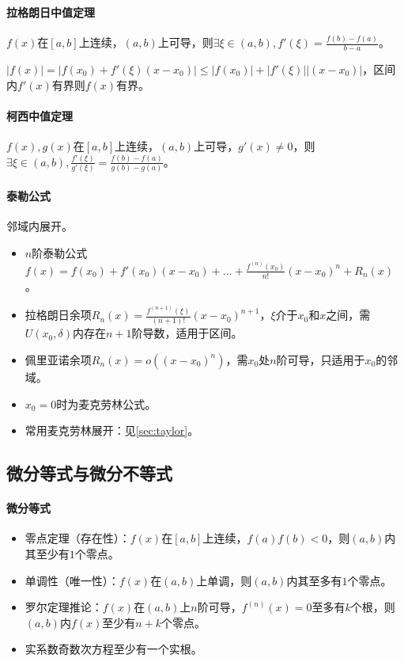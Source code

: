 \documentclass[
12pt, %
a4paper, 
oneside, %
headinclude,footinclude, %
]{scrartcl}
\begin{document}
\paragraph{拉格朗日中值定理}
$ f(x) $在$ [a, b] $上连续，$ (a, b) $上可导，则$ \exists \xi \in (a, b), f'(\xi) = \frac{f(b) - f(a)}{b - a} $。

$ |f(x)| = |f(x_0) + f'(\xi)(x - x_0)| \leq |f(x_0)| + |f'(\xi)||(x - x_0)| $，区间内$ f'(x) $有界则$ f(x) $有界。
\paragraph{柯西中值定理}
$ f(x),g(x) $在$ [a, b] $上连续，$ (a, b) $上可导，$ g'(x) \neq 0 $，则$ \exists \xi \in (a, b), \frac{f'(\xi)}{g'(\xi)} = \frac{f(b) - f(a)}{g(b) - g(a)} $。
\paragraph{泰勒公式}
邻域内展开。
\begin{itemize}
\item $ n $阶泰勒公式$ f(x) = f(x_0) + f'(x_0)(x - x_0) + \dots + \frac{f^{(n)}(x_0)}{n!}(x - x_0)^n + R_n(x) $。
\item 拉格朗日余项$ R_n(x) = \frac{f^{(n + 1)}(\xi)}{(n + 1)!}(x - x_0)^{n + 1} $，$ \xi $介于$ x_0 $和$ x $之间，需$ U(x_0, \delta) $内存在$ n + 1 $阶导数，适用于区间。
\item 佩里亚诺余项$ R_n(x) = o((x-x_0)^n) $，需$ x_0 $处$ n $阶可导，只适用于$ x_0 $的邻域。
\item $ x_0 = 0 $时为麦克劳林公式。
\item 常用麦克劳林展开：见\ref{sec:taylor}。
\end{itemize}
\subsection[微分等式与微分不等式]{微分等式与微分不等式}
\paragraph{微分等式}
\begin{itemize}
\item 零点定理（存在性）：$ f(x) $在$ [a, b] $上连续，$ f(a)f(b) < 0 $，则$ (a, b) $内其至少有$ 1 $个零点。
\item 单调性（唯一性）：$ f(x) $在$ (a, b) $上单调，则$ (a, b) $内其至多有$ 1 $个零点。
\item 罗尔定理推论：$ f(x) $在$ (a, b) $上$ n $阶可导，$ f^{(n)}(x) = 0 $至多有$ k $个根，则$ (a, b) $内$ f(x) $至少有$ n + k $个零点。
\item 实系数奇数次方程至少有一个实根。
\end{itemize}
\end{document}
